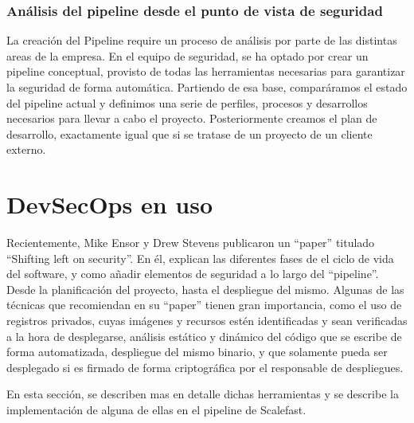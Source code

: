 \documentclass[12pt]{report} %
\begin{document}
\subsubsection{Análisis del pipeline desde el punto de vista de seguridad}

La creación del Pipeline require un proceso de análisis por parte de las distintas areas de la empresa.
En el equipo de seguridad, se ha optado por crear un pipeline conceptual, provisto de todas las herramientas necesarias para garantizar la seguridad de forma automática.
Partiendo de esa base, comparáramos el estado del pipeline actual y definimos una serie de perfiles, procesos y desarrollos necesarios para llevar a cabo el proyecto.
Posteriormente creamos el plan de desarrollo, exactamente igual que si se tratase de un proyecto de un cliente externo.



\section{DevSecOps en uso}

Recientemente, Mike Ensor y Drew Stevens publicaron un ``paper'' titulado ``Shifting left on security''.
En él, explican las diferentes fases de el ciclo de vida del software, y como añadir elementos de seguridad a lo largo del ``pipeline''. 
Desde la planificación del proyecto, hasta el despliegue del mismo.
Algunas de las técnicas que recomiendan en su ``paper'' tienen gran importancia, como el uso de registros privados, cuyas imágenes y recursos estén identificadas y sean verificadas a la hora de desplegarse, análisis estático y dinámico del código que se escribe de forma automatizada, despliegue del mismo binario, y que solamente pueda ser desplegado si es firmado de forma criptográfica por el responsable de despliegues.\cite{Ensor2021}

En esta sección, se describen mas en detalle dichas herramientas y se describe la implementación de alguna de ellas en el pipeline de Scalefast.

\clearpage

\printglossary[type=\acronymtype]

\printglossary




\end{document}
